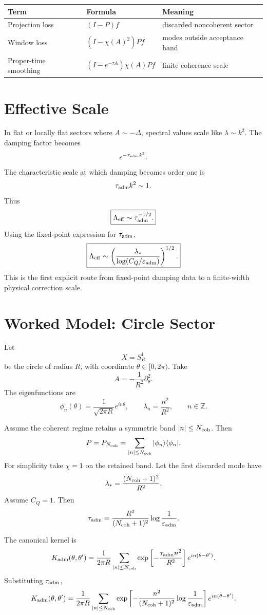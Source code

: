 \documentclass[11pt]{article}
\begin{document}
\begin{center}
\begin{tabular}{lll}
\hline
Term & Formula & Meaning\\
\hline
Projection loss & \((I-P)f\) & discarded noncoherent sector\\
Window loss & \((I-\chi(A)^2)Pf\) & modes outside acceptance band\\
Proper-time smoothing & \((I-e^{-\tau A})\chi(A)Pf\) & finite coherence scale\\
\hline
\end{tabular}
\end{center}

\section{Effective Scale}

In flat or locally flat sectors where \(A\sim -\Delta\), spectral values scale like \(\lambda\sim k^2\). The damping factor becomes
\[
e^{-\tau_{\rm adm}k^2}.
\]
The characteristic scale at which damping becomes order one is
\[
\tau_{\rm adm} k^2\sim1.
\]
Thus
\[
\boxed{
\Lambda_{\rm eff}\sim \tau_{\rm adm}^{-1/2}.
}
\]
Using the fixed-point expression for \(\tau_{\rm adm}\),
\[
\boxed{
\Lambda_{\rm eff}
\sim
\left(
\frac{\lambda_\ast}{\log(C_Q/\varepsilon_{\rm adm})}
\right)^{1/2}.
}
\]
This is the first explicit route from fixed-point damping data to a finite-width physical correction scale.

\section{Worked Model: Circle Sector}

Let
\[
X=S^1_R
\]
be the circle of radius \(R\), with coordinate \(\theta\in[0,2\pi)\). Take
\[
A=-\frac{1}{R^2}\partial_\theta^2.
\]
The eigenfunctions are
\[
\phi_n(\theta)=\frac{1}{\sqrt{2\pi R}}e^{in\theta},
\qquad
\lambda_n=\frac{n^2}{R^2},
\qquad n\in\mathbb Z.
\]

Assume the coherent regime retains a symmetric band \(|n|\le N_{\rm coh}\). Then
\[
P=P_{N_{\rm coh}}
=
\sum_{|n|\le N_{\rm coh}}|\phi_n\rangle\langle\phi_n|.
\]
For simplicity take \(\chi=1\) on the retained band. Let the first discarded mode have
\[
\lambda_\ast=\frac{(N_{\rm coh}+1)^2}{R^2}.
\]
Assume \(C_Q=1\). Then
\[
\tau_{\rm adm}
=
\frac{R^2}{(N_{\rm coh}+1)^2}
\log\frac{1}{\varepsilon_{\rm adm}}.
\]

The canonical kernel is
\[
K_{\rm adm}(\theta,\theta')
=
\frac{1}{2\pi R}
\sum_{|n|\le N_{\rm coh}}
\exp\left[
-\frac{\tau_{\rm adm}n^2}{R^2}
\right]
e^{in(\theta-\theta')}.
\]
Substituting \(\tau_{\rm adm}\),
\[
K_{\rm adm}(\theta,\theta')
=
\frac{1}{2\pi R}
\sum_{|n|\le N_{\rm coh}}
\exp\left[
-\frac{n^2}{(N_{\rm coh}+1)^2}
\log\frac{1}{\varepsilon_{\rm adm}}
\right]
e^{in(\theta-\theta')}.
\]
\end{document}
